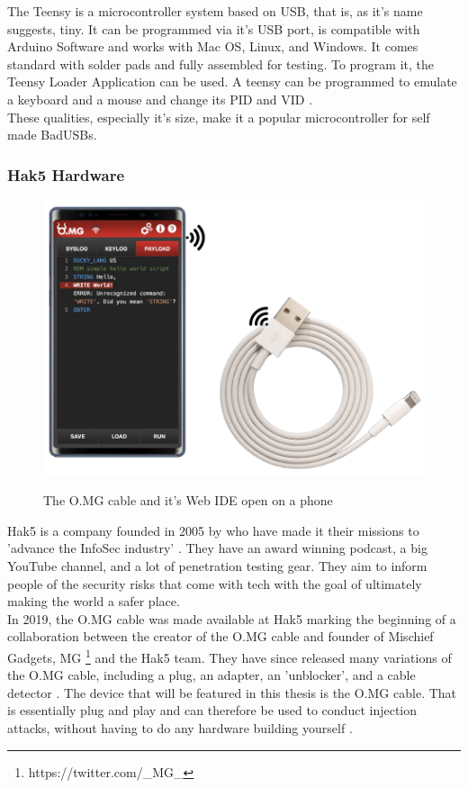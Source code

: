 The Teensy  \cite{TeensyUSBDevelopment} is a microcontroller system based on USB, that is, as it's name suggests, tiny. It can be programmed via it's USB port, is compatible with Arduino Software and works with Mac OS, Linux, and Windows. It comes standard with solder pads and fully assembled for testing. To program it, the Teensy Loader Application can be used.
A teensy can be programmed to emulate a keyboard and a mouse and change its PID and VID \cite{farhiMalboardNovelUser2019}.\\
These qualities, especially it's size, make it a popular microcontroller for self made BadUSBs. 


\subsubsection{Hak5 Hardware} \label{Hak5Hardware}

\begin{figure}[H]
    \centering
    \includegraphics[width=0.5\linewidth]{OMGCable.png}
    \caption{The O.MG cable and it's Web IDE open on a phone}
    \label{fig:OMGCable}
    \cite{hak5MGCable}
\end{figure}

Hak5 is a company founded in 2005 by who have made it their missions to 'advance the InfoSec industry' \cite{hak5}. They have an award winning podcast, a big YouTube channel, and a lot of penetration testing gear. They aim to inform people of the security risks that come with tech with the goal of ultimately making the world a safer place. \\
In 2019, the O.MG cable was made available at Hak5 \cite{MGCable2019a} marking the beginning of a collaboration between the creator of the O.MG cable and founder of Mischief Gadgets, MG \footnote{https://twitter.com/_MG_} and the Hak5 team. They have since released many variations of the O.MG cable, including a plug, an adapter, an 'unblocker', and a cable detector \cite{hak5MischiefGadgets}. The device that will be featured in this thesis is the O.MG cable. That is essentially plug and play and can therefore be used to conduct injection attacks, without having to do any hardware building yourself \cite{hak5MGCable}. 



